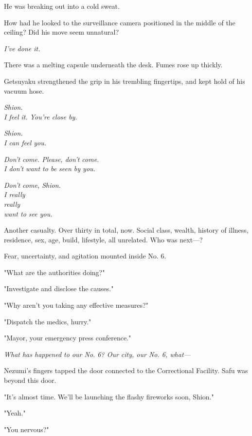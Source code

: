 He was breaking out into a cold sweat.

How had he looked to the surveillance camera positioned in the middle of
the ceiling? Did his move seem unnatural?

\emph{I've done it.}

There was a melting capsule underneath the desk. Fumes rose up thickly.

Getsuyaku strengthened the grip in his trembling fingertips, and kept
hold of his vacuum hose.

\myspace

\emph{Shion.\\
	I feel it. You're close by.}

\myspace

\emph{Shion.\\
	I can feel you.}

\myspace

\emph{Don't come. Please, don't come.\\
	I don't want to be seen by you.}

\myspace

\emph{Don't come, Shion.\\
	I really\\
	really\\
	want to see you.}

\myspace

Another casualty. Over thirty in total, now. Social class, wealth,
history of illness, residence, sex, age, build, lifestyle, all
unrelated. Who was next---?

Fear, uncertainty, and agitation mounted inside No. 6.

"What are the authorities doing?"

"Investigate and disclose the causes."

"Why aren't you taking any effective measures?"

"Dispatch the medics, hurry."

"Mayor, your emergency press conference."

\emph{What has happened to our No. 6? Our city, our No. 6, what---}

\myspace

Nezumi's fingers tapped the door connected to the Correctional Facility.
Safu was beyond this door.

"It's almost time. We'll be launching the flashy fireworks soon, Shion."

"Yeah."

"You nervous?"

